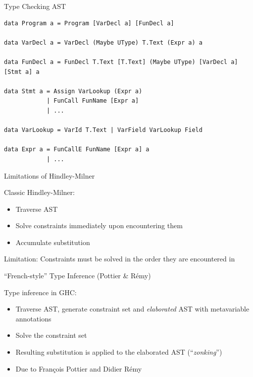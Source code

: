 \documentclass[dvipsnames,aspectratio=169]{beamer}
\begin{document}
\begin{frame}[fragile]{Type Checking AST}

  \begin{verbatim}
data Program a = Program [VarDecl a] [FunDecl a]

data VarDecl a = VarDecl (Maybe UType) T.Text (Expr a) a

data FunDecl a = FunDecl T.Text [T.Text] (Maybe UType) [VarDecl a] [Stmt a] a

data Stmt a = Assign VarLookup (Expr a)
            | FunCall FunName [Expr a]
            | ...

data VarLookup = VarId T.Text | VarField VarLookup Field

data Expr a = FunCallE FunName [Expr a] a
            | ...
\end{verbatim}

\end{frame}


\begin{frame}{Limitations of Hindley-Milner}

  Classic Hindley-Milner:
  \begin{itemize}
    \item Traverse AST
    \item Solve constraints immediately upon encountering them
    \item Accumulate substitution
  \end{itemize}

  Limitation: Constraints must be solved in the order they are encountered in

\end{frame}


\begin{frame}{``French-style'' Type Inference (Pottier \& Rémy)}

  Type inference in GHC:
  \begin{itemize}
    \item Traverse AST, generate constraint set and \emph{elaborated} AST with
          metavariable annotations
    \item Solve the constraint set
    \item Resulting substitution is applied to the elaborated AST (``\emph{zonking}'')
    \item Due to François Pottier and Didier Rémy~
  \end{itemize}

\end{frame}
\end{document}
